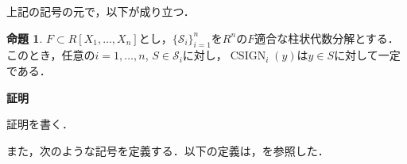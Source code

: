 \documentclass[uplatex, dvipdfmx]{jsarticle}
\makeatletter
\numberwithin{equation}{section}
\renewenvironment{proof}[1][\proofname]{\par
  \pushQED{\qed}%
  \normalfont \topsep6\p@\@plus6\p@\relax
  \trivlist
  \item\relax
  {\bfseries
  #1\@addpunct{.}}\hspace\labelsep\ignorespaces
}{
  \popQED\endtrivlist\@endpefalse
}
\DeclareMathOperator{\CSIGN}{CSIGN}
\theoremstyle{definition}
\newtheorem{proposition}[definition]{命題}
\renewcommand{\proofname}{\textbf{証明}}
\makeatother
\begin{document}
上記の記号の元で，以下が成り立つ．
\begin{proposition}
     $F \subset R[X_1, \dots, X_n]$とし，$\{\mathcal{S}_i\}_{i=1}^n$を$R^n$の$F$適合な柱状代数分解とする．
     このとき，任意の$i=1, \dots, n$, $S \in \mathcal{S}_i$に対し，$\CSIGN_i(y)$は$y \in S$に対して一定である．
\end{proposition}

\begin{proof}
     証明を書く．
\end{proof}


また，次のような記号を定義する．以下の定義は，\cite[Notation 11.12.]{MR2248869}を参照した．
\end{document}
